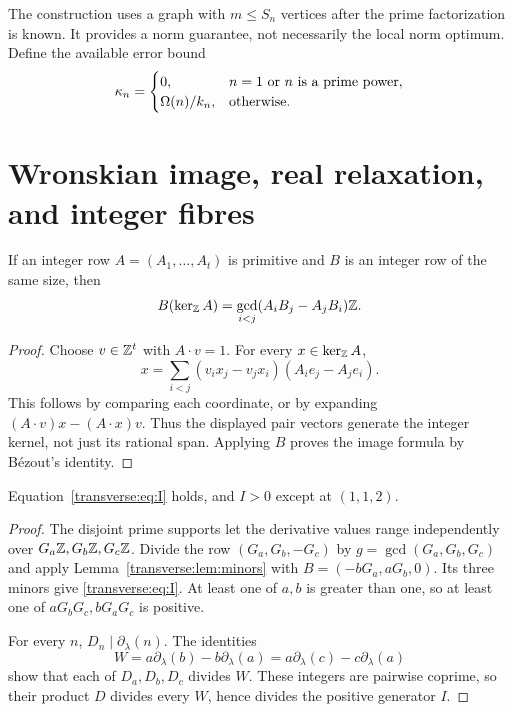The construction uses a graph with $m\le S_n$ vertices after the prime factorization is known. It provides a norm guarantee, not necessarily the local norm optimum. Define the available error bound
\begin{equation}\label{transverse:eq:kappa}
 \kappa_n=\begin{cases}
 0,&n=1\text{ or }n\text{ is a prime power},\\
 \Omega(n)/k_n,&\text{otherwise}.
 \end{cases}
\end{equation}

\section{Wronskian image, real relaxation, and integer fibres}\label{transverse:sec:global}
\begin{lemma}\label{transverse:lem:minors}
If an integer row $A=(A_1,\ldots,A_t)$ is primitive and $B$ is an integer row of the same size, then
\[
 B(\ker_{\mathbb Z} A)=\gcd_{i<j}(A_iB_j-A_jB_i)\mathbb Z.
\]
\end{lemma}
\begin{proof}
Choose $v\in\mathbb Z^t$ with $A\cdot v=1$. For every $x\in\ker_{\mathbb Z}A$,
\[
 x=\sum_{i<j}(v_i x_j-v_j x_i)(A_i e_j-A_j e_i).
\]
This follows by comparing each coordinate, or by expanding $(A\cdot v)x-(A\cdot x)v$. Thus the displayed pair vectors generate the integer kernel, not just its rational span. Applying $B$ proves the image formula by B\'ezout's identity.
\end{proof}

\begin{proposition}\label{transverse:prop:image}
Equation~\eqref{transverse:eq:I} holds, and $I>0$ except at $(1,1,2)$.
\end{proposition}
\begin{proof}
The disjoint prime supports let the derivative values range independently over $G_a\mathbb Z,G_b\mathbb Z,G_c\mathbb Z$. Divide the row $(G_a,G_b,-G_c)$ by $g=\gcd(G_a,G_b,G_c)$ and apply Lemma~\ref{transverse:lem:minors} with $B=(-bG_a,aG_b,0)$. Its three minors give \eqref{transverse:eq:I}. At least one of $a,b$ is greater than one, so at least one of $aG_bG_c,bG_aG_c$ is positive.

For every $n$, $D_n\mid\partial_\lambda(n)$. The identities
\[
 W=a\partial_\lambda(b)-b\partial_\lambda(a)
   =a\partial_\lambda(c)-c\partial_\lambda(a)
\]
show that each of $D_a,D_b,D_c$ divides $W$. These integers are pairwise coprime, so their product $D$ divides every $W$, hence divides the positive generator $I$.
\end{proof}


